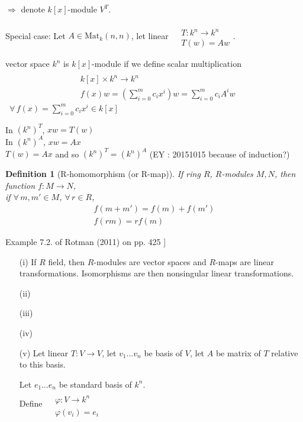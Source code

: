 \documentclass[10pt]{amsart}
\newtheorem{definition}{Definition}
\begin{document}
\begin{multicols*}{2}
\begin{enumerate}
	$\Longrightarrow $ denote $k[x]$-module $V^T$.  
	
	Special case: Let $A \in \text{Mat}_k(n,n)$, let linear $\begin{aligned} & \quad \\
	& T :k^n \to k^n \\
	& T(w) = Aw \end{aligned}$.  
	
	vector space $k^n$ is $k[x]$-module if we define scalar multiplication 
	\[
	\begin{aligned} & \quad \\
	& k[x] \times k^n \to k^n \\
	& f(x)w = \left( \sum_{i=0}^m c_ix^i \right)w = \sum_{i=0}^m c_i A^i w \end{aligned}
	\] 
	\quad \, $\forall \, f(x) = \sum_{i=0}^m c_ix^i \in k[x]$
	
	In $(k^n)^T$, $xw = T(w)$ \\
	In $(k^n)^A$, $xw = Ax $ \\
	$T(w) = Ax$ and so $(k^n)^T = (k^n)^A$  (EY : 20151015 because of induction?)
\end{enumerate}


\begin{definition}[R-homomorphism (or R-map)]
If ring $R$, $R$-modules $M,N$, then \\
function $f: M\to N$, \\
if $\forall \, m, m' \in M$, $\forall \, r\in R$, 
\[
\begin{gathered}
	f(m+m') = f(m) + f(m') \\ 
f(rm) = rf(m)
\end{gathered}
\]
\end{definition}

Example 7.2. of Rotman (2011) on pp. 425 \cite{JRotman2010}] 

\begin{enumerate}
	\item[(i)] If $R$ field, then $R$-modules are vector spaces and $R$-maps are linear transformations.  Isomorphisms are then nonsingular linear transformations.  
	\item[(ii)] 
	\item[(iii)]
	\item[(iv)]
	\item[(v)] Let linear $T:V \to V$, let $v_1 \dots v_n$ be basis of $V$, let $A$ be matrix of $T$ relative to this basis.  
	
	Let $e_1 \dots e_n$ be standard basis of $k^n$.  \\
	Define $\begin{aligned} & \quad \\
	& \varphi : V \to k^n \\
	& \varphi(v_i) = e_i \end{aligned}$
	

\end{enumerate}
\end{multicols*}
\end{document}
